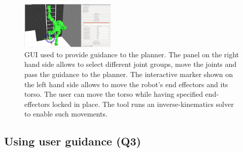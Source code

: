 \documentclass{article}
\begin{document}

\begin{figure}[tb]
  \centering
  	\includegraphics[width=0.4\textwidth]{fig/panel.png}
  \caption{
		GUI used to provide guidance to the planner. The panel on the right hand side allows to select different joint groups, move the joints and pass the guidance to the planner. The interactive marker shown on the left hand side allows to move the robot's end effectors and its torso. The user can move the torso while having specified end-effectors locked in place. The tool runs an inverse-kinematics solver to enable such movements.
}
   	\label{fig:gui}
  	\vspace{-4.5mm}
\end{figure}

\subsection{Using user guidance (Q3)}
\label{sec:q3}
\end{document}

